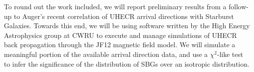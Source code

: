 To round out the work included, we will report preliminary results from a follow-up to Auger's recent correlation of UHECR arrival directions with Starburst Galaxies. Towards this end, we will be using software written by the High Energy Astrophysics group at CWRU to execute and manage simulations of UHECR back propagation through the JF12 magnetic field model. We will simulate a meaningful portion of the available arrival direction data, and use a $\chi^2$-like test to infer the significance of the distribution of SBGs over an isotropic distribution.









